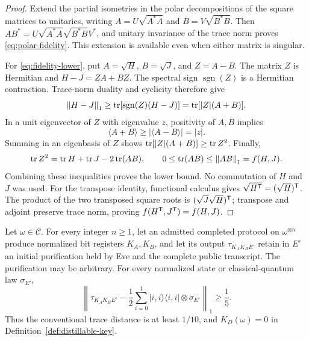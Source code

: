 \begin{proof}
Extend the partial isometries in the polar decompositions of the square
matrices to unitaries, writing
$A=U\sqrt{A^*A}$ and $B=V\sqrt{B^*B}$.  Then
$AB^*=U\sqrt{A^*A}\sqrt{B^*B}V^*$, and unitary invariance of the trace
norm proves \eqref{eq:polar-fidelity}.  This extension is available
even when either matrix is singular.

For \eqref{eq:fidelity-lower}, put $A=\sqrt H$, $B=\sqrt J$, and
$Z=A-B$.  The matrix $Z$ is Hermitian and
$H-J=ZA+BZ$.  The spectral sign $\operatorname{sgn}(Z)$ is a Hermitian
contraction.  Trace-norm duality and cyclicity therefore give
\[
 \left\lVert H-J\right\rVert_1
 \ge\operatorname{tr}[\operatorname{sgn}(Z)(H-J)]
 =\operatorname{tr}[|Z|(A+B)].
\]
In a unit eigenvector of $Z$ with eigenvalue $z$, positivity of $A,B$
implies
\[
 \langle A+B\rangle\ge|\langle A-B\rangle|=|z|.
\]
Summing in an eigenbasis of $Z$ shows
$\operatorname{tr}[|Z|(A+B)]\ge\operatorname{tr} Z^2$.  Finally,
\[
 \operatorname{tr} Z^2=\operatorname{tr} H+\operatorname{tr} J-2\operatorname{tr}(AB),
 \qquad 0\le\operatorname{tr}(AB)\le\left\lVert AB\right\rVert_1=f(H,J).
\]
Combining these inequalities proves the lower bound.  No commutation
of $H$ and $J$ was used.  For the transpose identity, functional
calculus gives $\sqrt{H^\mathsf T}=(\sqrt H)^\mathsf T$.  The product of the two
transposed square roots is $(\sqrt J\sqrt H)^\mathsf T$; transpose and adjoint
preserve trace norm, proving $f(H^\mathsf T,J^\mathsf T)=f(H,J)$.
\end{proof}

\begin{theorem}\label{thm:zero-key}
Let $\omega\in\mathscr C$.  For every integer $n\ge1$, let an admitted
completed protocol on $\omega^{\otimes n}$ produce normalized bit
registers $K_A,K_B$, and let its output $\tau_{K_AK_BE'}$ retain in
$E'$ an initial purification held by Eve and the complete public
transcript.  The purification may be arbitrary.  For every normalized
state or classical-quantum law $\sigma_{E'}$,
\begin{equation}\label{eq:uniform-secret-bit-gap}
 \left\lVert\tau_{K_AK_BE'}-
  \frac12\sum_{i=0}^1|i,i\rangle\langle i,i|\otimes\sigma_{E'}
 \right\rVert_1\ge\frac15.
\end{equation}
Thus the conventional trace distance is at least $1/10$, and
$K_D(\omega)=0$ in Definition~\ref{def:distillable-key}.
\end{theorem}

